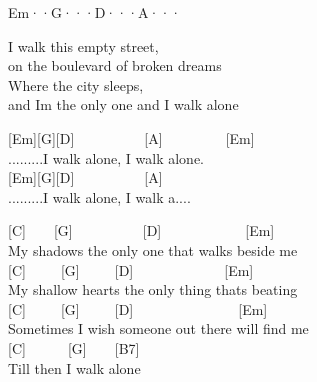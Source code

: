 \documentclass[
  letterpaper,
  a5paper]{memoir}
\begin{document}
Em··\textbar G···\textbar D···\textbar A···\textbar{}

I walk this empty street,\\
on the boulevard of broken dreams\\
Where the city sleeps,\\
and I\textquotesingle m the only one and I walk alone

{[}Em{]}{[}G{]}{[}D{]}~~~~~~~~~~{[}A{]}~~~~~~~~~{[}Em{]}\\
.........I walk alone, I walk alone.\\
{[}Em{]}{[}G{]}{[}D{]}~~~~~~~~~~{[}A{]}\\
.........I walk alone, I walk a....

\begin{tcolorbox}[enhanced jigsaw, breakable, bottomrule=.15mm, colframe=quarto-callout-color-frame, rightrule=.15mm, opacityback=0, colback=white, arc=.35mm, toprule=.15mm, leftrule=.75mm, left=2mm]

{[}C{]}~~~~{[}G{]}~~~~~~~~~~{[}D{]}~~~~~~~~~~~~{[}Em{]}\\
\hspace*{0.333em}\hspace*{0.333em}\hspace*{0.333em}\hspace*{0.333em}My
shadow\textquotesingle s the only one that walks beside me\\
{[}C{]}~~~~~{[}G{]}~~~~~{[}D{]}~~~~~~~~~~~~~{[}Em{]}\\
\hspace*{0.333em}\hspace*{0.333em}\hspace*{0.333em}\hspace*{0.333em}My
shallow heart\textquotesingle s the only thing that\textquotesingle s
beating\\
{[}C{]}~~~~~{[}G{]}~~~~~{[}D{]}~~~~~~~~~~~~~~~{[}Em{]}\\
\hspace*{0.333em}\hspace*{0.333em}\hspace*{0.333em}\hspace*{0.333em}Sometimes
I wish someone out there will find me\\
{[}C{]}~~~~~~{[}G{]}~~~~{[}B7{]}\\
\hspace*{0.333em}\hspace*{0.333em}\hspace*{0.333em}\hspace*{0.333em}Till
then I walk alone

\end{tcolorbox}
\end{document}
